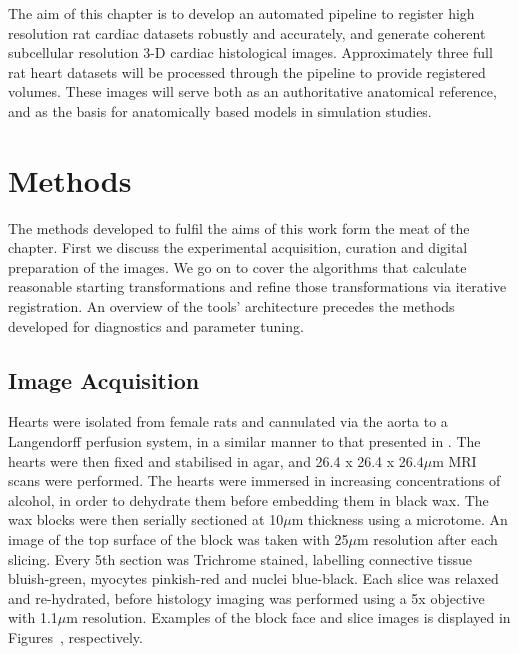   The aim of this chapter is to develop an automated pipeline to register high resolution rat cardiac datasets robustly and accurately, and generate coherent subcellular resolution 3-D cardiac histological images.  Approximately three full rat heart datasets will be processed through the pipeline to provide registered volumes. These images will serve both as an authoritative anatomical reference, and as the basis for anatomically based models in simulation studies.
  

\section{Methods} %
\label{sec:methods}
	The methods developed to fulfil the aims of this work form the meat of the chapter. First we discuss the experimental acquisition, curation and digital preparation of the images. We go on to cover the algorithms that calculate reasonable starting transformations and refine those transformations via iterative registration. An overview of the tools' architecture precedes the methods developed for diagnostics and parameter tuning.
	
  \subsection{Image Acquisition} %
  \label{sub:image_acquisition}
    Hearts were isolated from female rats and cannulated via the aorta to a Langendorff perfusion system, in a similar manner to that presented in \cite{Burton2006}. The hearts were then fixed and stabilised in agar, and 26.4 x 26.4 x 26.4$\mu$m MRI scans were performed. The hearts were immersed in increasing concentrations of alcohol, in order to dehydrate them before embedding them in black wax. The wax blocks were then serially sectioned at 10$\mu$m thickness using a microtome. An image of the top surface of the block was taken with 25$\mu$m resolution after each slicing. Every 5th section was Trichrome stained, labelling connective tissue bluish-green, myocytes pinkish-red and nuclei blue-black. Each slice was relaxed and re-hydrated, before histology imaging was performed using a 5x objective with 1.1$\mu$m resolution. Examples of the block face and slice images is displayed in Figures~, respectively.
		
